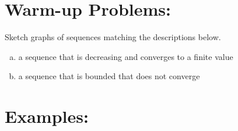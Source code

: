 \documentclass[10pt]{article}
\begin{document}


\section*{Warm-up Problems:}
Sketch graphs of sequences matching the descriptions below.

\setlength{\columnseprule}{0pt}
\begin{enumerate}[(a)]

\item a sequence that is decreasing and converges to a finite value

\item a sequence that is bounded that does not converge


\end{enumerate}

\pagebreak

\section*{Examples:}
\end{document}
